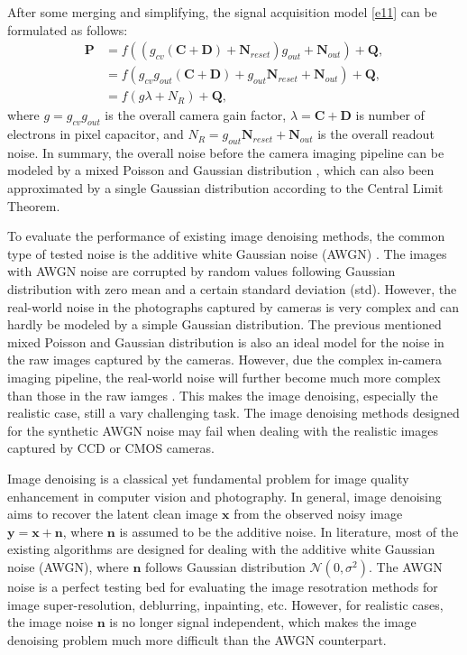 After some merging and simplifying, the signal acquisition model \ref{e11} can be formulated as follows:
\begin{equation}
\label{e12}
\begin{split}
\textbf{P} 
&=f((g_{cv}(\textbf{C}+\textbf{D})+\textbf{N}_{reset})g_{out}+\textbf{N}_{out})+\textbf{Q},
\\
&=f(g_{cv}g_{out}(\textbf{C}+\textbf{D})+g_{out}\textbf{N}_{reset}+\textbf{N}_{out})+\textbf{Q},
\\
&=f(g\lambda+N_{R})+\textbf{Q},
\end{split}
\end{equation}
where $g = g_{cv}g_{out}$ is the overall camera gain factor, $\lambda=\textbf{C}+\textbf{D}$ is number of electrons in pixel capacitor, and $N_{R}=g_{out}\textbf{N}_{reset}+\textbf{N}_{out}$ is the overall readout noise. In summary, the overall noise before the camera imaging pipeline can be modeled by a mixed Poisson and Gaussian distribution \cite{Foipractical}, which can also been approximated by a single Gaussian distribution according to the Central Limit Theorem.

To evaluate the performance of existing image denoising methods, the common type of tested noise is the additive white Gaussian noise (AWGN) \cite{bm3d,ksvd}. The images with AWGN noise are corrupted by random values following Gaussian distribution with zero mean and a certain standard deviation (std). However, the real-world noise in the photographs captured by cameras is very complex and can hardly be modeled by a simple Gaussian distribution. The previous mentioned mixed Poisson and Gaussian distribution \cite{Foipractical} is also an ideal model for the noise in the raw images captured by the cameras. However, due the complex in-camera imaging pipeline, the real-world noise will further become much more complex than those in the raw iamges \cite{crosschannel2016,karaimer_brown_ECCV_2016}. This makes the image denoising, especially the realistic case, still a vary challenging task. The image denoising methods designed for the synthetic AWGN noise may fail when dealing with the realistic images captured by CCD or CMOS cameras.


Image denoising is a classical yet fundamental problem for image quality enhancement in computer vision and photography. In general, image denoising aims to recover the latent clean image $\bm{x}$ from the observed noisy image $\bm{y}=\bm{x}+\bm{n}$, where $\bm{n}$ is assumed to be the additive noise. In literature, most of the existing algorithms are designed for dealing with the additive white Gaussian noise (AWGN), where $\bm{n}$ follows Gaussian distribution $\mathcal{N}(0,\sigma^{2})$.  The AWGN noise is a perfect testing bed for evaluating the image resotration methods for image super-resolution, deblurring, inpainting, etc. However, for realistic cases, the image noise $\bm{n}$ is no longer signal independent, which makes the image denoising problem much more difficult than the AWGN counterpart.


